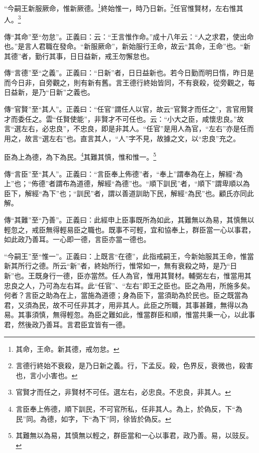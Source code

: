 “今嗣王新服厥命，惟新厥德。\footnote{其命，王命。新其德，戒勿怠。}終始惟一，時乃日新。\footnote{言德行終始不衰殺，是乃日新之義。行，下孟反。殺，色界反，衰微也，殺害也，言小小害也。}任官惟賢材，左右惟其人。\footnote{官賢才而任之，非賢材不可任。選左右，必忠良。不忠良，非其人。}


{\noindent\zhuan{}\fzbyks 傳“其命”至“勿怠”。正義曰：云：“王言惟作命。”成十八年云：“人之求君，使出命也。”是言人君職在發命。“新服厥命”，新始服行王命，故云“其命，王命”也。“新其德”者，勤行其事，日日益新，戒王勿懈怠也。 \par}

{\noindent\zhuan{}\fzbyks 傳“言德”至“之義”。正義曰：“日新”者，日日益新也。若今日勤而明日惰，昨日是而今日非，自旁觀之，則有新有舊。言王德行終始皆同，不有衰殺，從旁觀之，每日益新，是乃“日新”之義也。 \par}

{\noindent\zhuan{}\fzbyks 傳“官賢”至“其人”。正義曰：“任官”謂任人以官，故云“官賢才而任之”，言官用賢才而委任之。雲“任賢使能”，非賢才不可任也。云：“小大之臣，咸懷忠良。”故言“選左右，必忠良”，不忠良，即是非其人。“任官”是用人為官，“左右”亦是任而用之，故言“選左右”也。直言其人，“人”字不見，故據之文，以“忠良”充之。 \par}

臣為上為德，為下為民。\footnote{言臣奉上佈德，順下訓民，不可官所私，任非其人。為上，於偽反，下“為民”同。為德，如字，下“為下”同，徐皆於偽反。}其難其慎，惟和惟一。\footnote{其難無以為易，其慎無以輕之，群臣當和一心以事君，政乃善。易，以豉反。}

{\noindent\zhuan{}\fzbyks 傳“言臣”至“其人”。正義曰：“言臣奉上佈德”者，“奉上”謂奉為在上，解經“為上”也；“佈德”者謂布為道德，解經“為德”也。“順下訓民”者，“順下”謂卑順以為臣下，解經“為下”也；“訓民”者，謂以善道訓助下民，解經“為民”也。顧氏亦同此解。 \par}

{\noindent\zhuan{}\fzbyks 傳“其難”至“乃善”。正義曰：此經申上臣事既所為如此，其難無以為易，其慎無以輕忽之，戒臣無得輕易臣之職也。既事不可輕，宜和協奉上，群臣當一心以事君，如此政乃善耳。一心即一德，言臣亦當一德也。 \par}

{\noindent\shu{}\fzkt “今嗣王”至“惟一”。正義曰：上既言“在德”，此指戒嗣王，今新始服其王命，惟當新其所行之德。所云“新”者，終始所行，惟常如一，無有衰殺之時，是乃“日新”也。王既身行一德，臣亦當然。任人為官，惟用其賢材。輔弼左右，惟當用其忠良之人，乃可為左右耳。此“任官”、“左右”即王之臣也。臣之為用，所施多矣。何者？言臣之助為在上，當施為道德；身為臣下，當須助為於民也。臣之既當為君，又須為民，故不可任非其才，用非其人。此臣之所職，其事甚難，無得以為易。其事須慎，無得輕忽。為臣之難如此，惟當群臣和順，惟當共秉一心，以此事君，然後政乃善耳。言君臣宜皆有一德。 \par}

